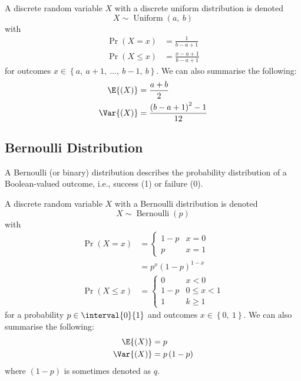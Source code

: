 \documentclass{article}
\begin{document}
\begin{multicols}{3}
    A discrete random variable \(X\) with a discrete uniform distribution is denoted
    \begin{equation*}
        X \sim \operatorname{Uniform}{\left( a,\: b \right)}
    \end{equation*}
    with
    \begin{align*}
        \Pr{\left( X = x \right)}    & = \frac{1}{b - a + 1}         \\
        \Pr{\left( X \leq x \right)} & = \frac{x - a + 1}{b - a + 1}
    \end{align*}
    for outcomes \(x \in \left\{ a,\: a + 1,\: \dots,\: b - 1,\: b \right\}\).
    We can also summarise the following:
    \begin{align*}
        \E{\left( X \right)}   & = \frac{a + b}{2}                           \\
        \Var{\left( X \right)} & = \frac{\left( b - a + 1 \right)^2 - 1}{12}
    \end{align*}
    \subsection{Bernoulli Distribution}
    A Bernoulli (or binary) distribution describes the probability distribution of a Boolean-valued
    outcome, i.e., success (1) or failure (0).

    A discrete random variable \(X\) with a Bernoulli distribution is denoted
    \begin{equation*}
        X \sim \operatorname{Bernoulli}{\left( p \right)}
    \end{equation*}
    with
    \begin{align*}
        \Pr{\left( X = x \right)}    & = \begin{cases}
                                             1 - p & x = 0 \\
                                             p     & x = 1
                                         \end{cases}                    \\
                                     & = p^x \left( 1 - p \right)^{1 - x} \\
        \Pr{\left( X \leq x \right)} & = \begin{cases}
                                             0     & x < 0        \\
                                             1 - p & 0 \leq x < 1 \\
                                             1     & k \geq 1
                                         \end{cases}
    \end{align*}
    for a probability \(p \in \interval{0}{1}\) and outcomes \(x \in \left\{ 0,\: 1 \right\}\).
    We can also summarise the following:
    \begin{align*}
        \E{\left( X \right)}   & = p                      \\
        \Var{\left( X \right)} & = p \left( 1 - p \right)
    \end{align*}
    where \(\left( 1 - p \right)\) is sometimes denoted as \(q\).

\end{multicols}
\end{document}
